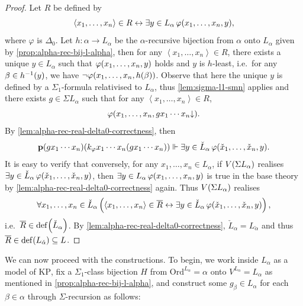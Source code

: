 \documentclass[12pt,openany]{book}
\theoremstyle{plain}
\theoremstyle{definition}
\newcommand\tuple[1]{\left\langle #1 \right\rangle}
\newcommand\opA[1]{\mathop{\forall #1}}
\newcommand\opE[1]{\mathop{\exists #1}}
\DeclareMathOperator\dd{def}
\newcommand\KP{\mathrm{KP}}
\newcommand\Ord{\mathrm{Ord}}
\newcommand\bp{\mathbf{p}}
\begin{document}
\begin{proof}
  Let $R$ be defined by
  \[\tuple{x_1, \ldots, x_n} \in R \leftrightarrow \opE{y \in L_\alpha} \varphi\mleft(x_1, \ldots, x_n, y\mright),\]
  where $\varphi$ is $\Delta_0$. Let $h : \alpha \rightarrow L_\alpha$ be the $\alpha$-recursive bijection from $\alpha$ onto $L_\alpha$ given by \autoref{prop:alpha-rec-bij-l-alpha}, then for any $\tuple{x_1, \ldots, x_n} \in R$, there exists a unique $y \in L_\alpha$ such that $\varphi\mleft(x_1, \ldots, x_n, y\mright)$ holds and $y$ is $h$-least, i.e.\ for any $\beta \in h^{-1}\mleft(y\mright)$, we have $\neg \varphi\mleft(x_1, \ldots, x_n, h\mleft(\beta\mright)\mright)$. Observe that here the unique $y$ is defined by a $\Sigma_1$-formula relativised to $L_\alpha$, thus \autoref{lem:sigma-l1-smn} applies and there exists $g \in \Sigma L_\alpha$ such that for any $\tuple{x_1, \ldots, x_n} \in R$,
  \[\varphi\mleft(x_1, \ldots, x_n, g x_1 \cdots x_n {\downarrow}\mright).\]
  By \autoref{lem:alpha-rec-real-delta0-correctness}, then
  \[\bp \mleft(g x_1 \cdots x_n\mright) \mleft(k_\varphi x_1 \cdots x_n \mleft(g x_1 \cdots x_n\mright)\mright)\Vdash \opE{y \in \check{L}_\alpha} \varphi\mleft(\check{x}_1, \ldots, \check{x}_n, y\mright).\]
  It is easy to verify that conversely, for any $x_1, \ldots, x_n \in L_\alpha$, if $V\mleft(\Sigma L_\alpha\mright)$ realises $\opE{y \in \check{L}_\alpha} \varphi\mleft(\check{x}_1, \ldots, \check{x}_n, y\mright)$, then $\opE{y \in L_\alpha} \varphi\mleft(x_1, \ldots, x_n, y\mright)$ is true in the base theory by \autoref{lem:alpha-rec-real-delta0-correctness} again. Thus $V\mleft(\Sigma L_\alpha\mright)$ realises
  \[\opA{x_1, \ldots, x_n \in \check{L}_\alpha} \left(\tuple{x_1, \ldots, x_n} \in \overline{R} \leftrightarrow \opE{y \in \check{L}_\alpha} \varphi\mleft(\check{x}_1, \ldots, \check{x}_n, y\mright)\right),\]
  i.e.\ $\overline{R} \in \dd\mleft(\check{L}_\alpha\mright)$. By \autoref{lem:alpha-rec-real-delta0-correctness}, $\check{L}_\alpha = L_{\check{\alpha}}$ and thus $\overline{R} \in \dd\mleft(L_{\check{\alpha}}\mright) \subseteq L$.
\end{proof}

We can now proceed with the constructions. To begin, we work inside $L_\alpha$ as a model of $\KP$, fix a $\Sigma_1$-class bijection $H$ from $\Ord^{L_\alpha} = \alpha$ onto $V^{L_\alpha} = L_\alpha$ as mentioned in \autoref{prop:alpha-rec-bij-l-alpha}, and construct some $g_\beta \in L_\alpha$ for each $\beta \in \alpha$ through $\Sigma$-recursion as follows:
\end{document}
